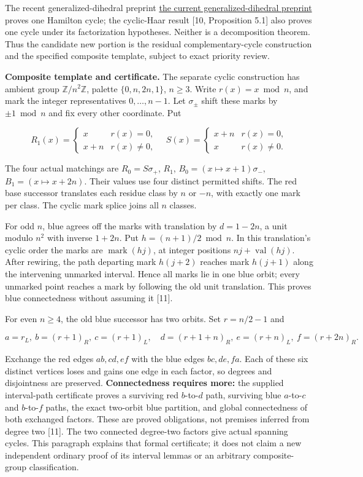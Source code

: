 \documentclass[
  11pt,
]{article}
\begin{document}
The recent generalized-dihedral preprint
\href{https://arxiv.org/html/1810.13311v3}{the current
generalized-dihedral preprint} proves one Hamilton cycle; the
cyclic-Haar result {[}10, Proposition 5.1{]} also proves one cycle under
its factorization hypotheses. Neither is a decomposition theorem. Thus
the candidate new portion is the residual complementary-cycle
construction and the specified composite template, subject to exact
priority review.

\textbf{Composite template and certificate.} The separate cyclic
construction has ambient group \(\mathbb Z/n^2\mathbb Z\), palette
\(\{0,n,2n,1\}\), \(n\ge3\). Write \(r(x)=x\bmod n\), and mark the
integer representatives \(0,\ldots,n-1\). Let \(\sigma_\pm\) shift these
marks by \(\pm1\bmod n\) and fix every other coordinate. Put

\[
R_1(x)=\begin{cases}x&r(x)=0,\\x+n&r(x)\ne0,\end{cases}
\quad
S(x)=\begin{cases}x+n&r(x)=0,\\x&r(x)\ne0.\end{cases}
\]

The four actual matchings are \(R_0=S\sigma_+\), \(R_1\),
\(B_0=(x\mapsto x+1)\sigma_-\), \(B_1=(x\mapsto x+2n)\). Their values
use four distinct permitted shifts. The red base successor translates
each residue class by \(n\) or \(-n\), with exactly one mark per class.
The cyclic mark splice joins all \(n\) classes.

For odd \(n\), blue agrees off the marks with translation by \(d=1-2n\),
a unit modulo \(n^2\) with inverse \(1+2n\). Put \(h=(n+1)/2\bmod n\).
In this translation's cyclic order the marks are
\(\operatorname{mark}(hj)\), at integer positions
\(nj+\operatorname{val}(hj)\). After rewiring, the path departing mark
\(h(j+2)\) reaches mark \(h(j+1)\) along the intervening unmarked
interval. Hence all marks lie in one blue orbit; every unmarked point
reaches a mark by following the old unit translation. This proves blue
connectedness without assuming it {[}11{]}.

For even \(n\ge4\), the old blue successor has two orbits. Set
\(r=n/2-1\) and

\[
a=r_L,\ b=(r+1)_R,\ c=(r+1)_L,\quad
d=(r+1+n)_R,\ e=(r+n)_L,\ f=(r+2n)_R.
\]

Exchange the red edges \(ab,cd,ef\) with the blue edges \(bc,de,fa\).
Each of these six distinct vertices loses and gains one edge in each
factor, so degrees and disjointness are preserved. \textbf{Connectedness
requires more:} the supplied interval-path certificate proves a
surviving red \(b\)-to-\(d\) path, surviving blue \(a\)-to-\(c\) and
\(b\)-to-\(f\) paths, the exact two-orbit blue partition, and global
connectedness of both exchanged factors. These are proved obligations,
not premises inferred from degree two {[}11{]}. The two connected
degree-two factors give actual spanning cycles. This paragraph explains
that formal certificate; it does not claim a new independent ordinary
proof of its interval lemmas or an arbitrary composite-group
classification.
\end{document}

